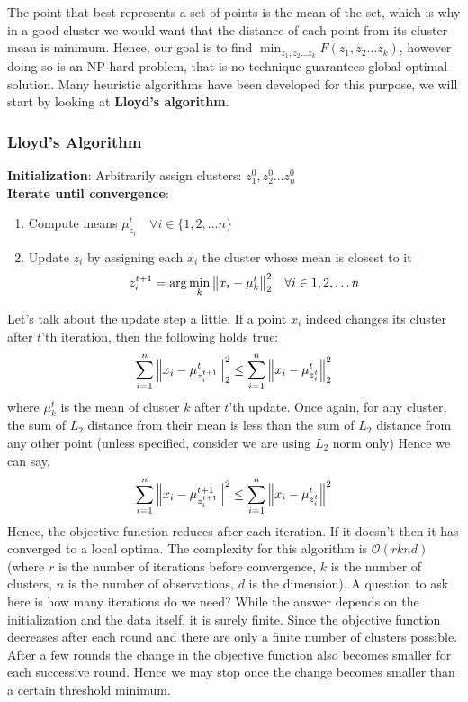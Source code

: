 \documentclass[12pt,a4paper]{article}
\begin{document}
The point that best represents a set of points is the mean of the set, which is why in a good cluster we would want that the distance of each point from its cluster mean is minimum. Hence, our goal is to find $\min_{z_1, z_2 \dots z_k} F(z_1, z_2 \dots z_k)$, however doing so is an NP-hard problem, that is no technique guarantees global optimal solution. Many heuristic algorithms have been developed for this purpose, we will start by looking at \textbf{Lloyd's algorithm}.

\subsubsection{Lloyd's Algorithm}

\begin{tcolorbox}[colback=Periwinkle!5!white,colframe=RoyalBlue!55!Red,title= \textbf{Lloyd's Algorithm}]
\textbf{Initialization}: Arbitrarily assign clusters: $z_1^0,z_2^0 \dots z_n^0$\\
\textbf{Iterate until convergence}:
\begin{enumerate}
    \item Compute means $\mu_{z_i}^t \quad \forall i \in \{1,2, \dots n\}$
    \item Update $z_i$ by assigning each $x_i$ the cluster whose mean is closest to it 
    $$z_i^{t+1} = \arg \min_k \norm{x_i - \mu_k^t}^2_2 \quad \forall i \in {1,2, \dots n}$$
\end{enumerate}
\end{tcolorbox}

Let's talk about the update step a little. If a point $x_i$ indeed changes its cluster after $t$'th iteration, then the following holds true:
$$ \sum_{i=1}^{n} \norm{x_i - \mu^t_{z_i^{t+1}}}^2_2 \leq \sum_{i=1}^{n} \norm{x_i - \mu^t_{z_i^{t}}}^2_2$$ where $\mu_k^t$ is the mean of cluster $k$ after $t$'th update.
Once again, for any cluster, the sum of $L_2$ distance from their mean is less than the sum of $L_2$ distance from any other point (unless specified, consider we are using $L_2$ norm only) Hence we can say,
$$ \sum_{i=1}^{n} \norm{x_i - \mu^{t+1}_{z_i^{t+1}}}^2 \leq \sum_{i=1}^{n} \norm{x_i - \mu^t_{z_i^{t}}}^2$$
Hence, the objective function reduces after each iteration. If it doesn't then it has converged to a local optima. The complexity for this algorithm is $\mathcal{O}(rknd)$ (where $r$ is the number of iterations before convergence, $k$ is the number of clusters, $n$ is the number of observations, $d$ is the dimension).
A question to ask here is how many iterations do we need? While the answer depends on the initialization and the data itself, it is surely finite. Since the objective function decreases after each round and there are only a finite number of clusters possible. After a few rounds the change in the objective function also becomes smaller for each successive round. Hence we may stop once the change becomes smaller than a certain threshold minimum.
\end{document}
